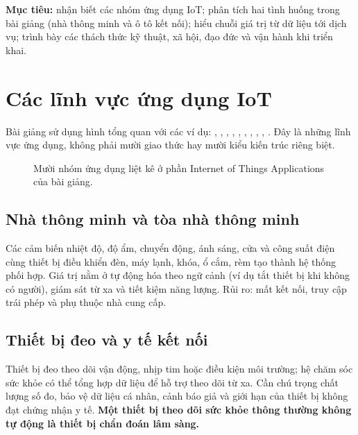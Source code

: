 \begin{notebox}
\textbf{Mục tiêu:} nhận biết các nhóm ứng dụng IoT; phân tích hai tình huống trong bài giảng (nhà thông minh và ô tô kết nối); hiểu chuỗi giá trị từ dữ liệu tới dịch vụ; trình bày các thách thức kỹ thuật, xã hội, đạo đức và vận hành khi triển khai.
\end{notebox}
\section{Các lĩnh vực ứng dụng IoT}
Bài giảng sử dụng hình tổng quan với các ví dụ: , , , , , , , , , . Đây là những lĩnh vực ứng dụng, không phải mười giao thức hay mười kiểu kiến trúc riêng biệt.

\begin{figure}[H]\centering
{}\caption{Mười nhóm ứng dụng liệt kê ở phần Internet of Things Applications của bài giảng.}
\end{figure}

\subsection{Nhà thông minh và tòa nhà thông minh}
Các cảm biến nhiệt độ, độ ẩm, chuyển động, ánh sáng, cửa và công suất điện cùng thiết bị điều khiển đèn, máy lạnh, khóa, ổ cắm, rèm tạo thành hệ thống phối hợp. Giá trị nằm ở tự động hóa theo ngữ cảnh (ví dụ tắt thiết bị khi không có người), giám sát từ xa và tiết kiệm năng lượng. Rủi ro: mất kết nối, truy cập trái phép và phụ thuộc nhà cung cấp.
\subsection{Thiết bị đeo và y tế kết nối}
Thiết bị đeo theo dõi vận động, nhịp tim hoặc điều kiện môi trường; hệ chăm sóc sức khỏe có thể tổng hợp dữ liệu để hỗ trợ theo dõi từ xa. Cần chú trọng chất lượng số đo, bảo vệ dữ liệu cá nhân, cảnh báo giả và giới hạn của thiết bị không đạt chứng nhận y tế. \textbf{Một thiết bị theo dõi sức khỏe thông thường không tự động là thiết bị chẩn đoán lâm sàng.}
